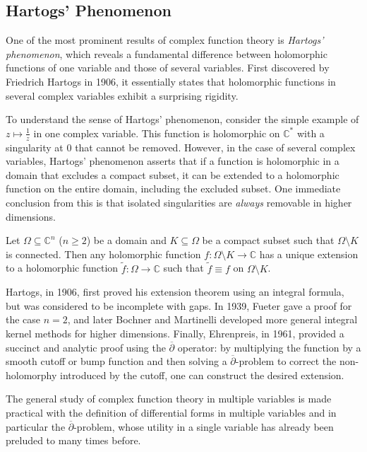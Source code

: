 \subsection{Hartogs' Phenomenon}
One of the most prominent results of complex function theory is \textit{Hartogs' phenomenon}, which reveals a fundamental difference between holomorphic functions of one variable and those of several variables. First
discovered by Friedrich Hartogs in 1906, it essentially states that holomorphic
functions in several complex variables exhibit a surprising rigidity.

To understand the sense of Hartogs' phenomenon, consider the simple example of
\(z\mapsto\frac1z\) in one complex variable. This function is holomorphic on
\(\mathbb{C}^*\) with a singularity at 0 that cannot be removed. However, in
the case of several complex variables, Hartogs' phenomenon asserts that if a
function is holomorphic in a domain that excludes a compact subset, it can be
extended to a holomorphic function on the entire domain, including the excluded
subset. One immediate conclusion from this is that isolated singularities are
\emph{always} removable in higher dimensions.
\begin{theorem}\label{thm:hartogsextensiontheorem}
    Let \(\Omega\subseteq\mathbb{C}^n\) (\(n\ge2\)) be a domain and \(K\subseteq\Omega\) be a compact subset such that \(\Omega\setminus K\) is connected. Then any holomorphic function \(f:\Omega\setminus K\to\mathbb{C}\) has a unique extension to a holomorphic function \(\widetilde{f}:\Omega\to\mathbb{C}\) such that \(\widetilde{f}\equiv f\) on \(\Omega\setminus K\).
\end{theorem}
Hartogs, in 1906, first proved his extension theorem using an integral formula, but was considered to be incomplete with gaps. In 1939, Fueter gave a proof for the case \(n=2\), and later Bochner and Martinelli developed more general integral kernel methods for higher dimensions. Finally, Ehrenpreis, in 1961, provided a succinct and analytic proof using the \(\overline{\partial}\) operator: by multiplying the function by a
smooth cutoff or bump function and then solving a \(\overline{\partial}\)-problem to correct the non-holomorphy introduced by the cutoff, one can construct the desired extension.

The general study of complex function theory in multiple variables is made
practical with the definition of differential forms in multiple variables and
in particular the \(\overline\partial\)-problem, whose utility in a single
variable has already been preluded to many times before.

